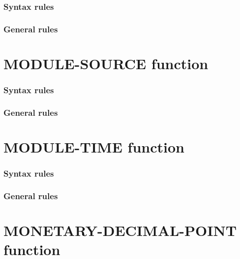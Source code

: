 \begin{syntax}[\gnucobolcolour]
   
\end{syntax}

\subsubsection{Syntax rules}

\subsubsection{General rules}

\section{MODULE-SOURCE function}

\begin{syntax}[\gnucobolcolour]
   
\end{syntax}

\subsubsection{Syntax rules}

\subsubsection{General rules}

\section{MODULE-TIME function}

\begin{syntax}[\gnucobolcolour]
   
\end{syntax}

\subsubsection{Syntax rules}

\subsubsection{General rules}

\section{MONETARY-DECIMAL-POINT function}

